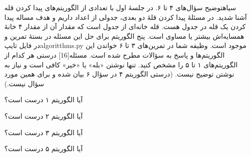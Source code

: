 ‌سیاه{توضیح سؤال‌های ۴ تا ۶.} در جلسۀ اول با تعدادی از الگوریتم‌های پیدا کردن قله آشنا شدید. در مسئلۀ پیدا کردن قلۀ دو بعدی، جدولی از اعداد داریم و هدف مساله پیدا کردن یک قله در جدول هست. قله خانه‌ای از جدول است که مقدار آن از مقدار ۴ خانۀ همسایه‌اش بیشتر یا مساوی است. پنج الگوریتم برای حل این مسئله در بستۀ تمرین و در فایل ‌تایپ{algoritthms.py} موجود است. وظیفه شما در تمرین‌های ۳ تا ۶ خواندن این الگوریتم‌ها و پاسخ به سؤالات مطرح شده است.
‌مسئله[16]
درستی هر کدام از الگوریتم‌های ۱ تا ۵ را مشخص کنید. تنها نوشتن «بله» یا «خیر» کافی است و نیاز به نوشتن توضیح نیست. (درستی الگوریتم ۴ در سؤال ۶ بیان شده و برای همین مورد سؤال نیست.)

 آیا الگوریتم ‌۱ درست است؟

 آیا الگوریتم‌ ۲ درست است؟


 آیا الگوریتم‌ ۳ درست است؟



 آیا الگوریتم‌ ۵ درست است؟










